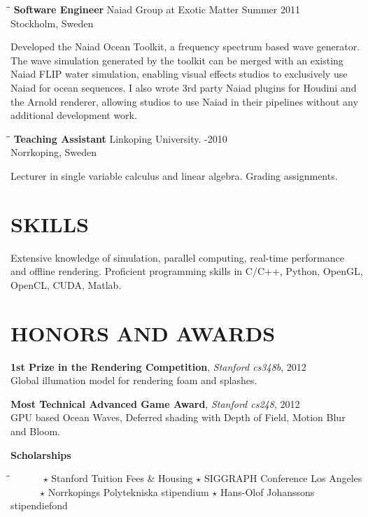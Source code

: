 \documentclass{res}
\begin{document}
\begin{resume}
   \begin{tabbing}
   \hspace{2.3in}\= \hspace{2.9in}\= \kill %
    {\bf Software Engineer} \>Naiad Group at Exotic Matter \> Summer 2011\\
                          \>Stockholm, Sweden
   \end{tabbing}\vspace{-20pt}
    Developed the Naiad Ocean Toolkit, a frequency spectrum based wave generator. The wave simulation generated by the toolkit can be merged with an existing Naiad FLIP water simulation, enabling visual effects studios to exclusively use Naiad for ocean sequences. I also wrote 3rd party Naiad plugins for Houdini and the Arnold renderer, allowing studios to use Naiad in their pipelines without any additional development work.
   \begin{tabbing}%
   \hspace{2.3in}\= \hspace{3.1in}\= \kill %
   {\bf Teaching Assistant}  \>Linkoping University. -2010\\
                          \>Norrkoping, Sweden
   \end{tabbing}\vspace{-20pt}
    Lecturer in single variable calculus and linear algebra. Grading assignments.       


\section{SKILLS}
Extensive knowledge of simulation, parallel computing, real-time performance and offline rendering.
Proficient programming skills in C/C++, Python, OpenGL, OpenCL, CUDA, Matlab.
 
\section{HONORS AND AWARDS}
{\bf1st Prize in the Rendering Competition}, \emph{Stanford cs348b}, 2012\\
Global illumation model for rendering foam and splashes.

{\bf Most Technical Advanced Game Award}, \emph{Stanford cs248}, 2012\\
GPU based Ocean Waves, Deferred shading with Depth of
Field, Motion Blur and Bloom.

{\bf Scholarships}
 \vspace{-0.2in}	
\begin{tabbing}%
   \hspace{3.3in}\= \hspace{3.6in}\= \kill %
   ~~~~~~$\star$ Stanford Tuition Fees \& Housing \> $\star$ SIGGRAPH Conference Los Angeles \\
   ~~~~~~$\star$ Norrkopings Polytekniska stipendium \> $\star$ Hans-Olof Johanssons stipendiefond
   \end{tabbing}\vspace{-20pt}
\end{resume}
\end{document}
